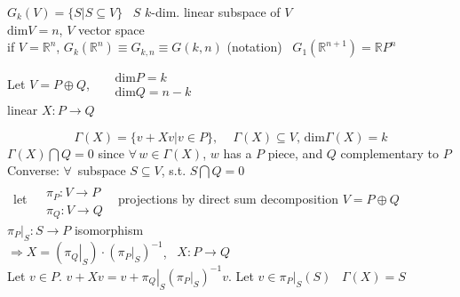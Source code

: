 \documentclass[11pt]{amsart}
\theoremstyle{definition}
\begin{document}





$G_k(V) = \lbrace S | S \subseteq V \rbrace$ \quad \, $S$ $k$-dim. linear subspace of $V$ \\
$\text{dim}V = n$, $V$ vector space  \\

if $V = \mathbb{R}^n$, $G_k(\mathbb{R}^n) \equiv G_{k,n} \equiv G(k,n)$ (notation) \quad \, $G_1(\mathbb{R}^{n+1}) = \mathbb{R}P^n$

Let $V = P \oplus Q$, \, $\begin{aligned}
  & \text{dim}P =k \\
  & \text{dim}Q = n-k \end{aligned}$ \\

linear $X: P \to Q$

\[
\Gamma(X) = \lbrace v + Xv | v \in P \rbrace , \quad \, \Gamma(X) \subseteq V, \, \text{dim}\Gamma(X) = k
\]
$\Gamma(X) \bigcap Q = 0$ since $\forall \, w \in \Gamma(X)$, $w$ has a $P$ piece, and $Q$ complementary to $P$ \\

Converse: $\forall \, $ subspace $S \subseteq V$, s.t. $S\bigcap Q = 0$ \\
\quad \, let $\begin{aligned}
  & \quad \\
  & \pi_P : V \to P \\
  & \pi_Q: V \to Q
\end{aligned}$ \quad \, projections by direct sum decomposition $V = P\oplus Q$ \\

$\left. \pi_P \right|_S : S \to P$ isomorphism  \\
$\Longrightarrow X = ( \left. \pi_Q \right|_S ) \cdot ( \left. \pi_P \right|_S)^{-1}$, \, $X: P \to Q$ \\

Let $v\in P$.  $v+ Xv = v +  \left. \pi_Q \right|_S (  \left. \pi_P \right|_S)^{-1} v$.  Let $v  \in \left. \pi_P \right|_S (S)$ \quad \, $\Gamma(X) = S$ \\
\end{document}
